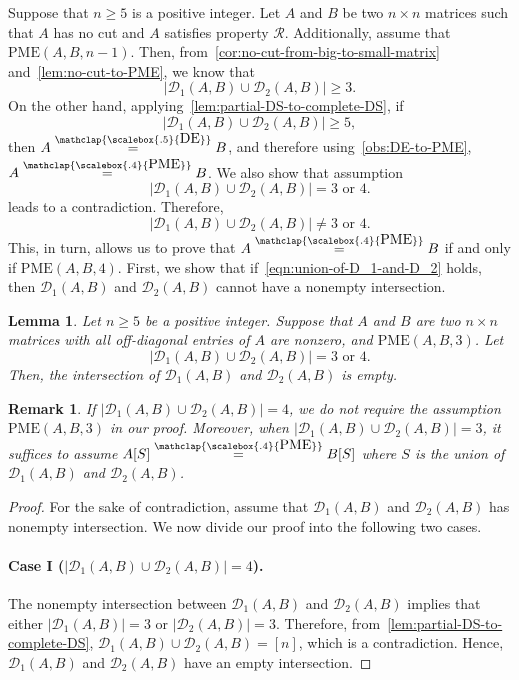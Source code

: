 \documentclass[11pt,letterpaper]{article}
\newtheorem{lemma}{Lemma}[section]
\newtheorem{remark}{Remark}[section]
\newcommand{\DE}{\stackrel{\mathclap{\scalebox{.5}{\mbox{DE}}}}{=}}
\newcommand{\PME}{\stackrel{\mathclap{\scalebox{.4}{\mbox{PME}}}}{=}}
\newcommand{\kPME}[3]{\mathrm{PME}(#1, #2, #3)}
\newcommand{\calD}{\mathcal{D}}
\newcommand{\prop}{\mathcal{R}}
\begin{document}
{{{Suppose that $n\geq 5$ is a positive integer. Let $A$ and $B$ be two $n\times n$ matrices such that $A$ has no cut and $A$ satisfies property $\prop$. Additionally, assume that $\kPME{A}{B}{n-1}$. Then, from~\cref{cor:no-cut-from-big-to-small-matrix} and~\cref{lem:no-cut-to-PME},  we know that $$|\calD_1\left(A, B\right)\cup \calD_2\left(A, B\right)|\geq 3.$$ On the other hand, applying~\cref{lem:partial-DS-to-complete-DS}, if $$|\calD_1\left(A, B\right)\cup \calD_2\left(A, B\right)|\geq 5,$$ then $A\DE B$, and therefore using~\cref{obs:DE-to-PME}, $A\PME B$. We also show that assumption  
\begin{equation}
\label{eqn:union-of-D_1-and-D_2}
|\calD_1\left(A, B\right)\cup \calD_2\left(A, B\right)|=3 \text{ or } 4.
\end{equation}
leads to a contradiction. Therefore, $$|\calD_1\left(A, B\right)\cup \calD_2\left(A, B\right)|\neq 3 \text{ or } 4.$$
This, in turn, allows us to prove that $A\PME B$ if and only if $\kPME{A}{B}{4}$. First, we show that if~\cref{eqn:union-of-D_1-and-D_2} holds, then $\calD_1(A, B)$ and $\calD_2(A,B)$  cannot have a nonempty intersection. 
\begin{lemma}
\label{prop:empty-intersection-of-D_1-and-D_2}
Let $n\geq 5$ be a positive integer. Suppose that $A$ and $B$ are two $n\times n$ matrices with all off-diagonal entries of $A$ are nonzero, and $\kPME{A}{B}{3}$. Let $$|\calD_1\left(A, B\right)\cup \calD_2\left(A, B\right)|=3 \text{ or } 4.$$ Then, the intersection of $\calD_1(A,B)$ and $\calD_2(A,B)$ is empty.
\end{lemma}
\begin{remark}
If $|\calD_1\left(A, B\right)\cup \calD_2\left(A, B\right)|=4$, we do not require the assumption $\kPME{A}{B}{3}$ in our proof. Moreover, when $|\calD_1\left(A, B\right)\cup \calD_2\left(A, B\right)|=3$, it suffices to assume $A[S]\PME B[S]$ where $S$ is the union of $\calD_1(A, B)$ and $\calD_2(A, B)$.
\end{remark}
\begin{proof}
For the sake of contradiction, assume that $\calD_1(A, B)$ and $\calD_2(A, B)$ has nonempty intersection. We now divide our proof into the following two cases.
\paragraph*{Case I ($|\calD_1\left(A, B\right)\cup \calD_2\left(A, B\right)|=4$).} The nonempty intersection between $\calD_1(A,B)$ and $\calD_2(A,B)$ implies that either $|\calD_1(A, B)|=3$ or $|\calD_2(A, B)|=3$. Therefore, from~\cref{lem:partial-DS-to-complete-DS}, $\calD_1(A, B)\cup\calD_2(A, B)=[n]$, which is a contradiction. Hence, $\calD_1(A,B)$ and $\calD_2(A,B)$ have an empty intersection.


\end{proof}}}}
\end{document}
